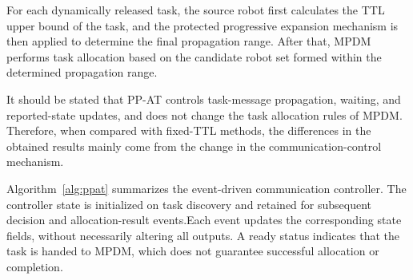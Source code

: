 \documentclass[type=submission,name=IR]{oae}
\begin{document}
For each dynamically released task, the source robot first calculates the TTL upper bound of the task, and the protected progressive expansion mechanism is then applied to determine the final propagation range. After that, MPDM performs task allocation based on the candidate robot set formed within the determined propagation range.

It should be stated that PP-AT controls task-message propagation, waiting, and reported-state updates, and does not change the task allocation rules of MPDM. Therefore, when compared with fixed-TTL methods, the differences in the obtained results mainly come from the change in the communication-control mechanism.




Algorithm~\ref{alg:ppat} summarizes the event-driven communication controller. The controller state is initialized on task discovery and retained for subsequent decision and allocation-result events.Each event updates the corresponding state fields, without necessarily altering all outputs. A ready status indicates that the task is handed to MPDM, which does not guarantee successful allocation or completion.
\end{document}
